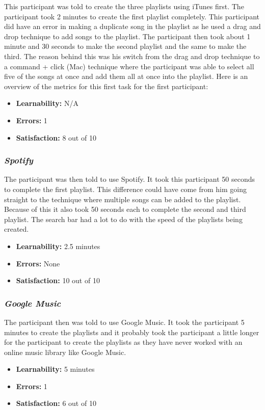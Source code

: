 \documentclass{article}
\begin{document}
{\begin{multicols}{2}
This participant was told to create the three playlists using iTunes first. The participant took 2 minutes to create the first playlist completely. This participant did have an error in making a duplicate song in the playlist as he used a drag and drop technique to add songs to the playlist. The participant then took about 1 minute and 30 seconds to make the second playlist and the same to make the third. The reason behind this was his switch from the drag and drop technique to a command + click (Mac) technique where the participant was able to select all five of the songs at once and add them all at once into the playlist. Here is an overview of the metrics for this first task for the first participant:
\begin{itemize}
	\item {\bf Learnability:} N/A
	\item {\bf Errors:} 1
	\item {\bf Satisfaction:} 8 out of 10 
\end{itemize}

\subsubsection{\it Spotify}
The participant was then told to use Spotify. It took this participant 50 seconds to complete the first playlist. This difference could have come from him going straight to the technique where multiple songs can be added to the playlist. Because of this it also took 50 seconds each to complete the second and third playlist. The search bar had a lot to do with the speed of the playlists being created.
\begin{itemize}
	\item {\bf Learnability:} 2.5 minutes
	\item {\bf Errors:} None
	\item {\bf Satisfaction:} 10 out of 10 
\end{itemize}

\subsubsection{\it Google Music}
The participant then was told to use Google Music. It took the participant 5 minutes to create the playlists and it probably took the participant a little longer for the participant to create the playlists as they have never worked with an online music library like Google Music.
\begin{itemize}
\item {\bf Learnability:} 5 minutes
	\item {\bf Errors:} 1
	\item {\bf Satisfaction:} 6 out of 10 
\end{itemize}


\end{multicols}}
\end{document}

